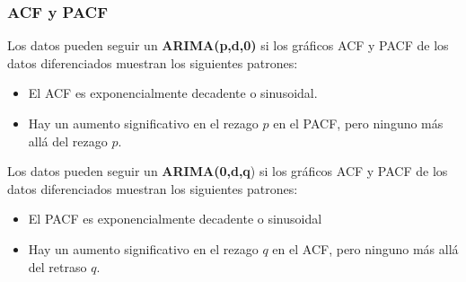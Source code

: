 \documentclass[10pt]{beamer}
\begin{document}



\begin{frame}[fragile]
\frametitle{ACF y PACF}


Los datos pueden seguir un \textbf{ARIMA(p,d,0)} si los gráficos ACF y PACF de los datos diferenciados muestran los siguientes patrones:

\begin{itemize}
\item El ACF es exponencialmente decadente o sinusoidal.
\item Hay un aumento significativo en el rezago $p$ en el PACF, pero ninguno más allá del rezago $p$.
\end{itemize}

\pause
\vspace{4mm}

Los datos pueden seguir un \textbf{ARIMA(0,d,q}) si los gráficos ACF y PACF de los datos diferenciados muestran los siguientes patrones:

\begin{itemize}
\item El PACF es exponencialmente decadente o sinusoidal
\item Hay un aumento significativo en el rezago $q$ en el ACF, pero ninguno más allá del retraso $q$.
\end{itemize}


\end{frame}


\end{document}
